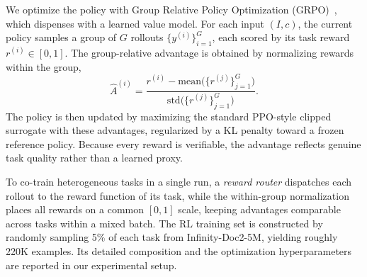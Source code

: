 We optimize the policy with Group Relative Policy Optimization (GRPO)~\cite{shao2024deepseekmathpushinglimitsmathematical}, which dispenses with a learned value model. For each input $(I,c)$, the current policy samples a group of $G$ rollouts $\{y^{(i)}\}_{i=1}^{G}$, each scored by its task reward $r^{(i)}\in[0,1]$. The group-relative advantage is obtained by normalizing rewards within the group,
\begin{equation}
\hat{A}^{(i)} = \frac{r^{(i)} - \mathrm{mean}\big(\{r^{(j)}\}_{j=1}^{G}\big)}{\mathrm{std}\big(\{r^{(j)}\}_{j=1}^{G}\big)}.
\end{equation}
The policy is then updated by maximizing the standard PPO-style clipped surrogate with these advantages, regularized by a KL penalty toward a frozen reference policy. Because every reward is verifiable, the advantage reflects genuine task quality rather than a learned proxy.

To co-train heterogeneous tasks in a single run, a \emph{reward router} dispatches each rollout to the reward function of its task, while the within-group normalization places all rewards on a common $[0,1]$ scale, keeping advantages comparable across tasks within a mixed batch. The RL training set is constructed by randomly sampling 5\% of each task from Infinity-Doc2-5M, yielding roughly 220K examples. Its detailed composition and the optimization hyperparameters are reported in our experimental setup.
